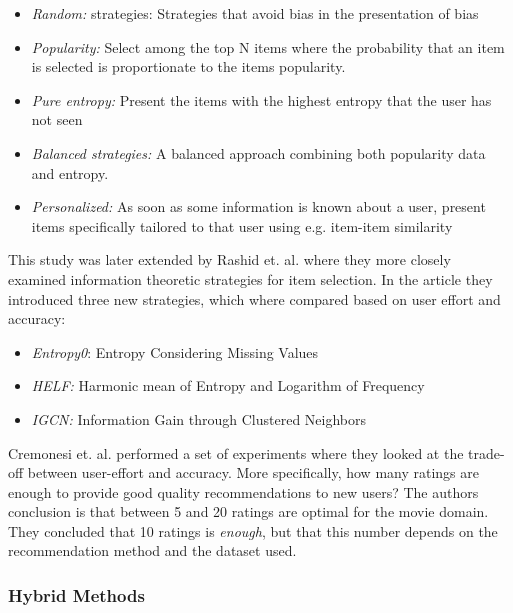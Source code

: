 \begin{itemize}
\item \emph{Random:} strategies: Strategies that avoid bias in the presentation
of bias
\item \emph{Popularity:} Select among the top N items where the probability
that an item is selected is proportionate to the items popularity.
\item \emph{Pure entropy:} Present the items with the highest entropy that the
user has not seen
\item \emph{Balanced strategies:} A balanced approach combining both popularity
data and entropy.
\item \emph{Personalized:} As soon as some information is known about a user,
present items specifically tailored to that user using e.g. item-item
similarity
\end{itemize}



This study was later extended by Rashid et. al. \cite{Rashid2008} where they
more closely examined information theoretic strategies for item selection. In the article they introduced three new strategies, which where compared based on user effort and accuracy:

\begin{itemize}
\item \emph{Entropy0}: Entropy Considering Missing Values
\item \emph{HELF:} Harmonic mean of Entropy and Logarithm of Frequency
\item \emph{IGCN:} Information Gain through Clustered Neighbors
\end{itemize}


Cremonesi et. al. \cite{Cremonesi2012} performed a set of experiments where
they looked at the trade-off between user-effort and accuracy. More
specifically, how many ratings are enough to provide good quality
recommendations to new users? The authors conclusion is that between 5 and 20
ratings are optimal for the movie domain. They concluded that 10
ratings is \emph{enough}, but that this number depends on the recommendation method
and the dataset used.

\subsubsection{Hybrid Methods}


